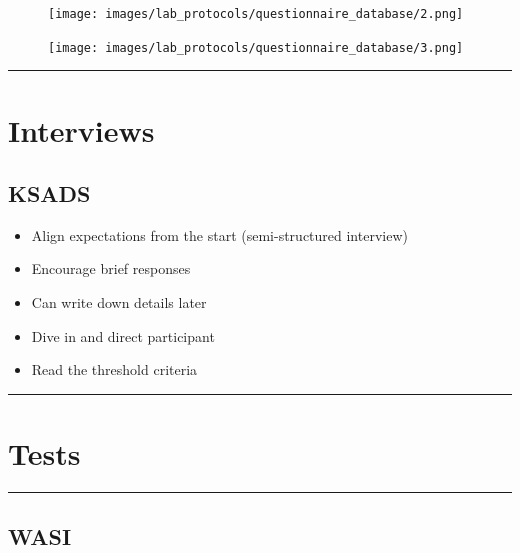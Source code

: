 \documentclass[
]{book}
\providecommand{\tightlist}{%
  \setlength{\itemsep}{0pt}\setlength{\parskip}{0pt}}
\begin{document}
\begin{figure}
\centering
\texttt{[image: images/lab\_protocols/questionnaire\_database/2.png]}
\caption{}
\end{figure}

\begin{figure}
\centering
\texttt{[image: images/lab\_protocols/questionnaire\_database/3.png]}
\caption{}
\end{figure}

\begin{center}\rule{0.5\linewidth}{0.5pt}\end{center}

\hypertarget{interviews}{%
\section{Interviews}\label{interviews}}

\hypertarget{ksads}{%
\subsection{KSADS}\label{ksads}}

\begin{itemize}
\tightlist
\item
  Align expectations from the start (semi-structured interview)
\item
  Encourage brief responses
\item
  Can write down details later
\item
  Dive in and direct participant
\item
  Read the threshold criteria
\end{itemize}

\begin{center}\rule{0.5\linewidth}{0.5pt}\end{center}

\hypertarget{tests}{%
\section{Tests}\label{tests}}

\begin{center}\rule{0.5\linewidth}{0.5pt}\end{center}

\hypertarget{wasi}{%
\subsection{WASI}\label{wasi}}
\end{document}
